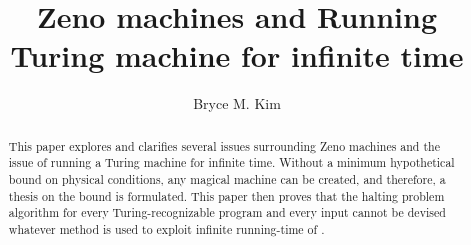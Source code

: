 \documentclass{roffin}
\begin{document}
\author{Bryce M. Kim}
\title{Zeno machines and Running Turing machine for infinite time}

\maketitle

\begin{abstract}
This paper explores and clarifies several issues surrounding Zeno machines and the issue of running a Turing machine for infinite time. Without a minimum hypothetical bound on physical conditions, any magical machine can be created, and therefore, a thesis on the bound is formulated. This paper then proves that the halting problem algorithm for every Turing-recognizable program and every input cannot be devised whatever method is used to exploit infinite running-time of .
\end{abstract}
\end{document}
